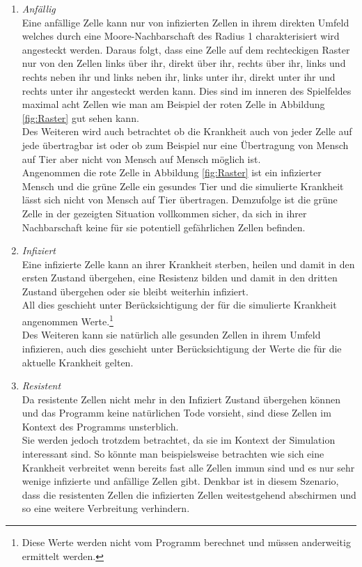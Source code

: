 \begin{enumerate}
\item{\emph{Anfällig}\\
Eine anfällige Zelle kann nur von infizierten Zellen in ihrem direkten Umfeld welches durch eine Moore-Nachbarschaft \cite{Weisstein:2014} des Radius 1 charakterisiert wird angesteckt werden. Daraus folgt, dass eine Zelle auf dem rechteckigen Raster nur von den Zellen links über ihr, direkt über ihr, rechts über ihr, links und rechts neben ihr und links neben ihr, links unter ihr, direkt unter ihr und rechts unter ihr angesteckt werden kann. Dies sind im inneren des Spielfeldes maximal acht Zellen wie man am Beispiel der roten Zelle in Abbildung \ref{fig:Raster} gut sehen kann.\\
Des Weiteren wird auch betrachtet ob die Krankheit auch von jeder Zelle auf jede übertragbar ist oder ob zum Beispiel nur eine Übertragung von Mensch auf Tier aber nicht von Mensch auf Mensch möglich ist.\\
Angenommen die rote Zelle in Abbildung \ref{fig:Raster} ist ein infizierter Mensch und  die grüne Zelle ein gesundes Tier und die simulierte Krankheit lässt sich nicht von Mensch auf Tier übertragen. Demzufolge ist die grüne Zelle in der gezeigten Situation vollkommen sicher, da sich in ihrer Nachbarschaft keine für sie potentiell gefährlichen Zellen befinden. 
}
\item{\emph{Infiziert}\\
Eine infizierte Zelle kann an ihrer Krankheit sterben, heilen und damit in den ersten Zustand übergehen, eine Resistenz bilden und damit in den dritten Zustand übergehen oder sie bleibt weiterhin infiziert.\\
All dies geschieht unter Berücksichtigung der für die simulierte Krankheit angenommen Werte.\footnote{Diese Werte werden nicht vom Programm berechnet und müssen anderweitig ermittelt werden.}\\
Des Weiteren kann sie natürlich alle gesunden Zellen in ihrem Umfeld infizieren, auch dies geschieht unter Berücksichtigung der Werte die für die aktuelle Krankheit gelten.
}

\item{\emph{Resistent}\\
Da resistente Zellen nicht mehr in den Infiziert Zustand übergehen können und das Programm keine natürlichen Tode vorsieht, sind diese Zellen im Kontext des Programms unsterblich.\\
Sie werden jedoch trotzdem betrachtet, da sie im Kontext der Simulation interessant sind. So könnte man beispielsweise betrachten wie sich eine Krankheit verbreitet wenn bereits fast alle Zellen immun sind und es nur sehr wenige infizierte und anfällige Zellen gibt. Denkbar ist in diesem Szenario, dass die resistenten Zellen die infizierten Zellen weitestgehend abschirmen und so eine weitere Verbreitung verhindern. 
}


\end{enumerate}
